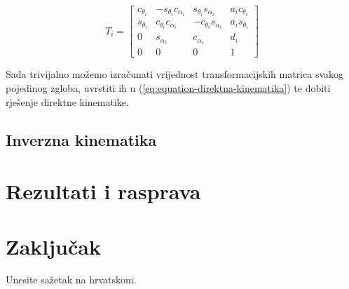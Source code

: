 \documentclass[times, utf8, diplomskirad]{fer}
\begin{document}
\renewcommand{\arraystretch}{1}
\begin{equation}
T_i=\left[\begin{array}{cccc}
c_{\theta_i} & -s_{\theta_i} c_{\alpha_i} & s_{\theta_i} s_{\alpha_i} & a_i c_{\theta_i} \\
s_{\theta_i} & c_{\theta_i} c_{\alpha_i} & -c_{\theta_i} s_{\alpha_i} & a_i s_{\theta_i} \\
0 & s_{\alpha_i} & c_{\alpha_i} & d_i \\
0 & 0 & 0 & 1
\end{array}\right]
    \label{eq:transformation-matrix-dh}
\end{equation}

Sada trivijalno možemo izračunati vrijednost transformacijskih matrica svakog pojedinog zgloba, uvrstiti ih u (\ref{eq:equation-direktna-kinematika}) te dobiti rješenje direktne kinematike.

\newpage
\section{Inverzna kinematika}



\chapter{Rezultati i rasprava}
\label{pog:rezultati_i_rasprava}



\chapter{Zaključak}
\label{pog:zakljucak}









\begin{sazetak}
  Unesite sažetak na hrvatskom.

  \blindtext
\end{sazetak}
\end{document}
